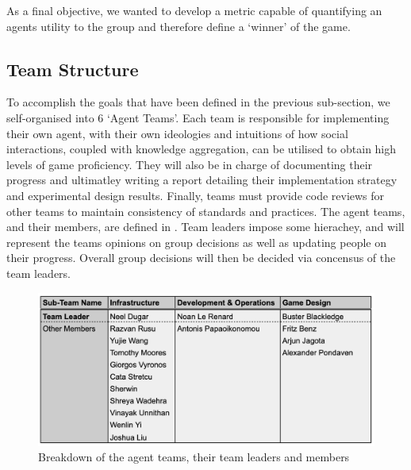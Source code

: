 As a final objective, we wanted to develop a metric capable of quantifying an agents utility to the group and therefore define a `winner' of the game. 



\subsection{Team Structure}\label{sec:team struct}

To accomplish the goals that have been defined in the previous sub-section, we self-organised into 6 `Agent Teams'. Each team is responsible for implementing their own agent, with their own ideologies and intuitions of how social interactions, coupled with knowledge aggregation, can be utilised to obtain high levels of game proficiency. They will also be in charge of documenting their progress and ultimatley writing a report detailing their implementation strategy and experimental design results. Finally, teams must provide code reviews for other teams to maintain consistency of standards and practices. The agent teams, and their members, are defined in . Team leaders impose some hierachey, and will represent the teams opinions on group decisions as well as updating people on their progress. Overall group decisions will then be decided via concensus of the team leaders. 

\begin{figure}[htb]
    \centering
    \includegraphics{000_introduction/images/agentteams.png}
    \caption{Breakdown of the agent teams, their team leaders and members}
    \label{fig:agentteams}
\end{figure}
    
